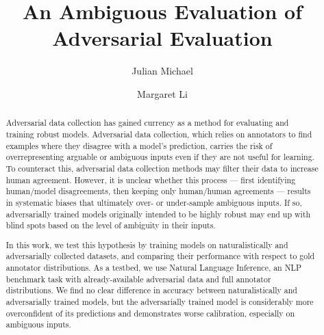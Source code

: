 \documentclass[10pt,a4paper]{article}
\title{An Ambiguous Evaluation of Adversarial Evaluation}
\author{Julian Michael}
\author{Margaret Li}
\affil{CSE 599: Empirical Foundations of Machine Learning \\
Paul G. Allen School of Computer Science \& Engineering, University of Washington \texttt{\{julianjm,margsli\}@cs.washington.edu}}
\date{}
\begin{document}
\maketitle

\begin{abstract}
  Adversarial data collection has gained currency as a method for evaluating and training robust
  models. Adversarial data collection, which relies on annotators to find examples where they
  disagree with a model's prediction, carries the risk of overrepresenting arguable or ambiguous
  inputs even if they are not useful for learning. To counteract this, adversarial data collection
  methods may filter their data to increase human agreement. However, it is unclear whether this
  process --- first identifying human/model disagreements, then keeping only human/human
  agreements --- results in systematic biases that ultimately over- or under-sample ambiguous
  inputs. If so, adversarially trained models originally intended to be highly robust may end up
  with blind spots based on the level of ambiguity in their inputs.

  In this work, we test this hypothesis by training models on naturalistically and adversarially
  collected datasets, and comparing their performance with respect to gold annotator distributions.
  As a testbed, we use Natural Language Inference, an NLP benchmark task with already-available
  adversarial data and full annotator distributions. We find no clear difference in accuracy
  between naturalistically and adversarially trained models, but the adversarially trained model is
  considerably more overconfident of its predictions and demonstrates worse calibration, especially
  on ambiguous inputs.
\end{abstract}

\end{document}
